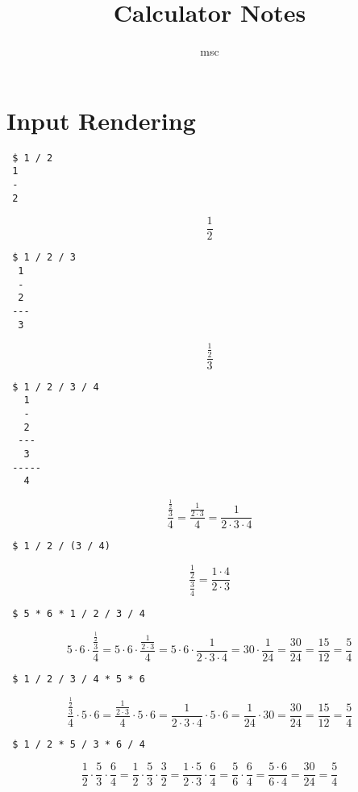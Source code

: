 \documentclass[a4paper,10pt]{article}
\title{Calculator Notes}
\author{msc}
\begin{document}




\section{Input Rendering}

\begin{verbatim}
 $ 1 / 2
 1
 -
 2
\end{verbatim}

$$\frac{1}{2}$$


\begin{verbatim}
 $ 1 / 2 / 3
  1
  -
  2
 ---
  3
\end{verbatim}

\[\frac{\frac{1}{2}}{3}\]


\begin{verbatim}
 $ 1 / 2 / 3 / 4
   1
   -
   2
  ---
   3
 -----
   4
\end{verbatim}
\[
\frac{\frac{\frac{1}{2}}{3}}{4}=\frac{\frac{1}{2\cdot3}}{4} = \frac{1}{2\cdot3\cdot4}
\]


\begin{verbatim}
 $ 1 / 2 / (3 / 4)
\end{verbatim}
\[
\frac{\frac{1}{2}}{\frac{3}{4}}=\frac{1\cdot4}{2\cdot3}
\]


\begin{verbatim}
 $ 5 * 6 * 1 / 2 / 3 / 4
\end{verbatim}
\[
5\cdot6\cdot\frac{\frac{\frac{1}{2}}{3}}{4} =
5\cdot6\cdot\frac{\frac{1}{2\cdot3}}{4} =
5\cdot6\cdot\frac{1}{2\cdot3\cdot4} =
30\cdot\frac{1}{24} =
\frac{30}{24} =
\frac{15}{12} =
\frac{5}{4}
\]


\begin{verbatim}
 $ 1 / 2 / 3 / 4 * 5 * 6
\end{verbatim}
\[
\frac{\frac{\frac{1}{2}}{3}}{4}\cdot5\cdot6 =
\frac{\frac{1}{2\cdot3}}{4}\cdot5\cdot6 =
\frac{1}{2\cdot3\cdot4}\cdot5\cdot6 =
\frac{1}{24}\cdot30 =
\frac{30}{24} =
\frac{15}{12} =
\frac{5}{4}
\]


\begin{verbatim}
 $ 1 / 2 * 5 / 3 * 6 / 4
\end{verbatim}
\[
\frac{1}{2}\cdot\frac{5}{3}\cdot\frac{6}{4} =
\frac{1}{2}\cdot\frac{5}{3}\cdot\frac{3}{2} =
\frac{1\cdot5}{2\cdot3}\cdot\frac{6}{4} =
\frac{5}{6}\cdot\frac{6}{4} =
\frac{5\cdot6}{6\cdot4} =
\frac{30}{24} =
\frac{5}{4}
\]
\end{document}
